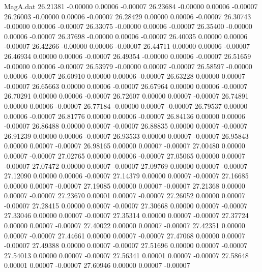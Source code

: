\begin{filecontents}{MagA.dat}
  26.21381   -0.00000    0.00006   -0.00007
  26.23684   -0.00000    0.00006   -0.00007
  26.26003   -0.00000    0.00006   -0.00007
  26.28429    0.00000    0.00006   -0.00007
  26.30743   -0.00000    0.00006   -0.00007
  26.33075   -0.00000    0.00006   -0.00007
  26.35400   -0.00000    0.00006   -0.00007
  26.37698   -0.00000    0.00006   -0.00007
  26.40035    0.00000    0.00006   -0.00007
  26.42266   -0.00000    0.00006   -0.00007
  26.44711    0.00000    0.00006   -0.00007
  26.46934    0.00000    0.00006   -0.00007
  26.49354   -0.00000    0.00006   -0.00007
  26.51659   -0.00000    0.00006   -0.00007
  26.53979   -0.00000    0.00007   -0.00007
  26.58597   -0.00000    0.00006   -0.00007
  26.60910    0.00000    0.00006   -0.00007
  26.63228    0.00000    0.00007   -0.00007
  26.65663    0.00000    0.00006   -0.00007
  26.67964    0.00000    0.00006   -0.00007
  26.70291    0.00000    0.00006   -0.00007
  26.72607    0.00000    0.00007   -0.00007
  26.74891    0.00000    0.00006   -0.00007
  26.77184   -0.00000    0.00007   -0.00007
  26.79537    0.00000    0.00006   -0.00007
  26.81776    0.00000    0.00006   -0.00007
  26.84136    0.00000    0.00006   -0.00007
  26.86488    0.00000    0.00007   -0.00007
  26.88835    0.00000    0.00007   -0.00007
  26.91239    0.00000    0.00006   -0.00007
  26.93533    0.00000    0.00007   -0.00007
  26.95843    0.00000    0.00007   -0.00007
  26.98165    0.00000    0.00007   -0.00007
  27.00480    0.00000    0.00007   -0.00007
  27.02765    0.00000    0.00006   -0.00007
  27.05065    0.00000    0.00007   -0.00007
  27.07472    0.00000    0.00007   -0.00007
  27.09769    0.00000    0.00007   -0.00007
  27.12090    0.00000    0.00006   -0.00007
  27.14379    0.00000    0.00007   -0.00007
  27.16685    0.00000    0.00007   -0.00007
  27.19085    0.00000    0.00007   -0.00007
  27.21368    0.00000    0.00007   -0.00007
  27.23670    0.00001    0.00007   -0.00007
  27.26052    0.00000    0.00007   -0.00007
  27.28415    0.00000    0.00007   -0.00007
  27.30668    0.00000    0.00007   -0.00007
  27.33046    0.00000    0.00007   -0.00007
  27.35314    0.00000    0.00007   -0.00007
  27.37724    0.00000    0.00007   -0.00007
  27.40022    0.00000    0.00007   -0.00007
  27.42351    0.00000    0.00007   -0.00007
  27.44661    0.00000    0.00007   -0.00007
  27.47068    0.00000    0.00007   -0.00007
  27.49388    0.00000    0.00007   -0.00007
  27.51696    0.00000    0.00007   -0.00007
  27.54013    0.00000    0.00007   -0.00007
  27.56341    0.00001    0.00007   -0.00007
  27.58648    0.00001    0.00007   -0.00007
  27.60946    0.00000    0.00007   -0.00007

\end{filecontents}

